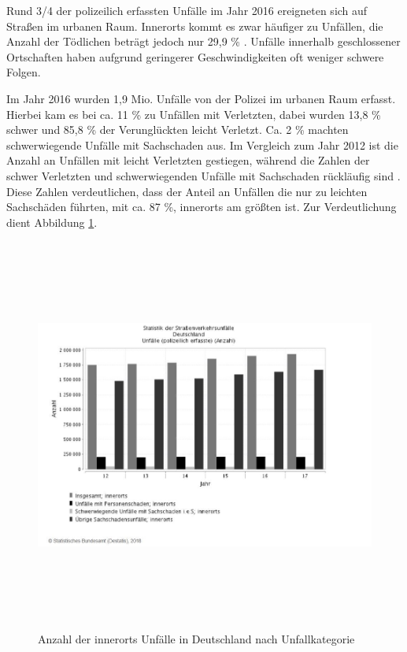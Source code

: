 Rund 3/4 der polizeilich erfassten Unfälle im Jahr 2016 ereigneten sich auf Straßen im urbanen Raum. Innerorts kommt es zwar häufiger zu Unfällen, die Anzahl der Tödlichen beträgt jedoch nur 29,9 \% \parencite[S. 149]{StatistischesBundesamt.2018}. Unfälle innerhalb geschlossener Ortschaften haben aufgrund geringerer Geschwindigkeiten oft weniger schwere Folgen.

Im Jahr 2016 wurden 1,9 Mio. Unfälle von der Polizei im urbanen Raum erfasst. Hierbei kam es bei ca. 11 \% zu Unfällen mit Verletzten, dabei wurden 13,8 \% schwer und 85,8 \% der Verunglückten leicht Verletzt. Ca. 2 \% machten schwerwiegende Unfälle mit Sachschaden aus. Im Vergleich zum Jahr 2012 ist die Anzahl an Unfällen mit leicht Verletzten gestiegen, während die Zahlen der schwer Verletzten und schwerwiegenden Unfälle mit Sachschaden rückläufig sind \parencite[S. 21]{StatistischesBundesamt.2018c}. Diese Zahlen verdeutlichen, dass der Anteil an Unfällen die nur zu leichten Sachschäden führten, mit ca. 87 \%, innerorts am größten ist. Zur Verdeutlichung dient Abbildung \ref{fig:Schaden}.

\begin{savenotes}
	\begin{figure}[H]
		\centering
		\includegraphics[width=17cm,height=13cm]{figures/Schaden}
		\caption[Anzahl der Unfälle innerorts nach Unfallkategorie]{Anzahl der innerorts Unfälle in Deutschland nach Unfallkategorie \parencite{StatistischesBundesamt.2018d}}\label{fig:Schaden}
	\end{figure}
\end{savenotes}

